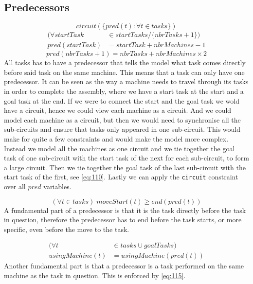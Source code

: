  
 
 \subsection{Predecessors}
 \begin{equation}\label{eq:111}
 circuit(\{pred(t) : \forall t \in tasks\})
 \end{equation}
 \begin{equation}\label{eq:109}
 \begin{aligned}
 (\forall startTask &\in startTasks / \{nbrTasks + 1\}) \\
 pred(startTask) &= startTask + nbrMachines - 1
 \end{aligned}
 \end{equation}
 \begin{equation}\label{eq:110}
 pred(nbrTasks + 1) = nbrTasks + nbrMachines \times 2
 \end{equation}
 All tasks has to have a predecessor that tells the model what task comes directly before said task on the same machine. This means that a task can only have one predecessor. It can be seen as the way a machine needs to travel through its tasks in order to complete the assembly, where we have a start task at the start and a goal task at the end. If we were to connect the start and the goal task we wold have a circuit, hence we could view each machine as a circuit. And we could model each machine as a circuit, but then we would need to synchronise all the sub-circuits and ensure that tasks only appeared in one sub-circuit. This would make for quite a few constraints and would make the model more complex. Instead we model all the machines as one circuit and we tie together the goal task of one sub-circuit with the start task of the next for each sub-circuit, to form a large circuit. Then we tie together the goal task of the last sub-circuit with the start task of the first, see \ref{eq:110}. Lastly we can apply the \texttt{circuit} constraint over all $pred$ variables.
 
 \begin{equation}\label{eq:108}
 (\forall t \in tasks) \; moveStart(t) \geq end(pred(t))
 \end{equation}
A fundamental part of a predecessor is that it is the task directly before the task in question, therefore the predecessor has to end before the task starts, or more specific, even before the move to the task.
 
 \begin{equation}\label{eq:115}
 \begin{aligned}
 (\forall t &\in tasks \cup goalTasks) \\
 usingMachine(t) &= usingMachine(pred(t)) 
 \end{aligned}
 \end{equation}
Another fundamental part is that a predecessor is a task performed on the same machine as the task in question. This is enforced by \ref{eq:115}.

